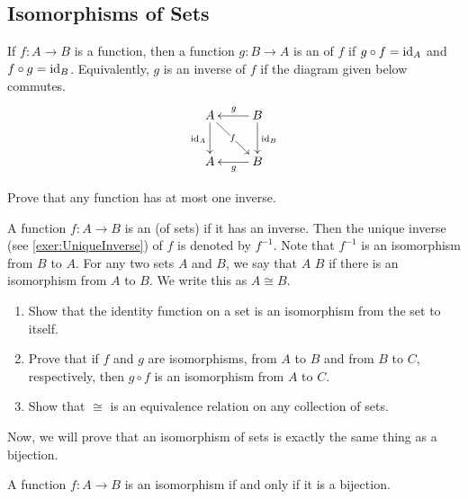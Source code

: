 \subsection{Isomorphisms of Sets}\label{subsec:SetIsos}
If $f \colon A \to B$ is a function, then a function $g \colon B \to A$ is an  of $f$ if $g \circ f = \mathrm{id}_A$ and $f \circ g = \mathrm{id}_B$. Equivalently, $g$ is an inverse of $f$ if the diagram given below commutes.
\begin{equation*}
\xymatrix{
A \ar[d]_{\id_A} \ar[dr]|-f & B \ar[d]^{\id_B} \ar[l]_g\\
A & B \ar[l]^g
}
\end{equation*}

\begin{Exercise}\label{exer:UniqueInverse}
Prove that any function has at most one inverse.\\
\end{Exercise}

A function $f \colon A \to B$ is an  (of sets) if it has an inverse. Then the unique inverse (see \cref{exer:UniqueInverse}) of $f$ is denoted by $f^{-1}$. Note that $f^{-1}$ is an isomorphism from $B$ to $A$. For any two sets $A$ and $B$, we say that $A$  $B$ if there is an isomorphism from $A$ to $B$. We write this as $A \cong B$.

\begin{Exercise}
\mbox{}
\begin{enumerate}
\item Show that the identity function on a set is an isomorphism from the set to itself.
\item Prove that if $f$ and $g$ are isomorphisms, from $A$ to $B$ and from $B$ to $C$, respectively, then $g \circ f$ is an isomorphism from $A$ to $C$.
\item Show that $\cong$ is an equivalence relation on any collection of sets.
\end{enumerate}
\end{Exercise}

Now, we will prove that an isomorphism of sets is exactly the same thing as a bijection.

\begin{Theorem}
A function $f \colon A \to B$ is an isomorphism if and only if it is a bijection.
\end{Theorem}

